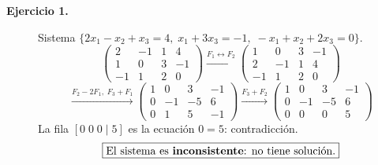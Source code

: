 \documentclass[11pt,letterpaper]{article}
\theoremstyle{definition}
\theoremstyle{plain}
\begin{document}
\begin{description}

\item[\textbf{Ejercicio 1.}]
Sistema $\{2x_1-x_2+x_3=4,\; x_1+3x_3=-1,\; -x_1+x_2+2x_3=0\}$.
\[
  \left(\begin{array}{ccc|c}2&-1&1&4\\1&0&3&-1\\-1&1&2&0\end{array}\right)
  \xrightarrow{F_1\leftrightarrow F_2}
  \left(\begin{array}{ccc|c}1&0&3&-1\\2&-1&1&4\\-1&1&2&0\end{array}\right)
\]
\[
  \xrightarrow{F_2-2F_1,\;F_3+F_1}
  \left(\begin{array}{ccc|c}1&0&3&-1\\0&-1&-5&6\\0&1&5&-1\end{array}\right)
  \xrightarrow{F_3+F_2}
  \left(\begin{array}{ccc|c}1&0&3&-1\\0&-1&-5&6\\0&0&0&5\end{array}\right)
\]
La fila $[0\;0\;0\mid 5]$ es la ecuación $0=5$: contradicción.
\[\boxed{\text{El sistema es \textbf{inconsistente}: no tiene solución.}}\]


\end{description}
\end{document}
